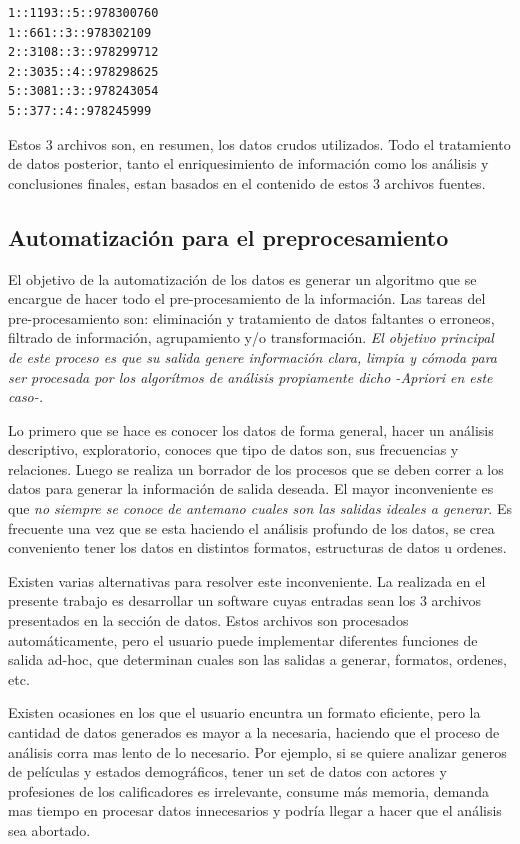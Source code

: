 \documentclass[journal]{IEEEtran}
\begin{document}
\begin{enumerate}
\begin{itemize}
        \begin{lstlisting}[frame=single,breaklines=true]
1::1193::5::978300760
1::661::3::978302109
2::3108::3::978299712
2::3035::4::978298625
5::3081::3::978243054
5::377::4::978245999
        \end{lstlisting}
    \end{itemize}

\end{enumerate}

Estos 3 archivos son, en resumen, los datos crudos utilizados. 
Todo el tratamiento de datos posterior, tanto el enriquesimiento de información como los
análisis y conclusiones finales, estan basados en el contenido de estos 3 archivos
fuentes.

\subsection{Automatización para el preprocesamiento}
El objetivo de la automatización de los datos es generar un algoritmo que se encargue
de hacer todo el pre-procesamiento de la información. Las tareas del pre-procesamiento
son: eliminación  y tratamiento  de datos faltantes o erroneos, filtrado de información,
agrupamiento y/o transformación.
\emph{El objetivo principal de este proceso es que su salida genere información clara, limpia y cómoda
para ser procesada por los algorítmos de análisis propiamente dicho -Apriori en este caso-.}

Lo primero que se hace es conocer los datos de forma general, hacer un análisis descriptivo,
exploratorio, conoces que tipo de datos son, sus frecuencias y relaciones. Luego se realiza un
borrador de los procesos que se deben correr a los datos para generar la información de salida 
deseada. El mayor inconveniente es que \emph{no siempre se conoce de antemano cuales son las
salidas ideales a generar}. Es frecuente una vez que se esta haciendo el análisis profundo
de los datos, se crea conveniento tener los datos en distintos formatos, estructuras de
datos u ordenes.

Existen varias alternativas para resolver este inconveniente. La realizada en el presente
trabajo es desarrollar un software cuyas entradas sean los 3 archivos presentados en 
la sección de datos. Estos archivos son procesados automáticamente, pero el usuario
puede implementar diferentes funciones de salida ad-hoc, que determinan cuales son
las salidas a generar, formatos, ordenes, etc.

Existen ocasiones en los que el usuario encuntra un formato eficiente, pero la cantidad
de datos generados es mayor a la necesaria, haciendo que el proceso de análisis corra
mas lento de lo necesario. Por ejemplo, si se quiere analizar generos de películas y
estados demográficos, tener un set de datos con actores y profesiones de los calificadores
es irrelevante, consume más memoria, demanda mas tiempo en procesar datos innecesarios
y podría llegar a hacer que el análisis sea abortado.
\end{document}
